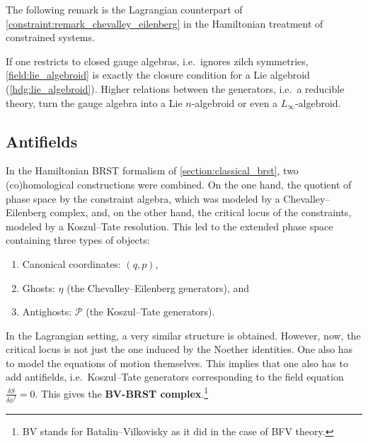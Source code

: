     The following remark is the Lagrangian counterpart of \cref{constraint:remark_chevalley_eilenberg} in the Hamiltonian treatment of constrained systems.
    \begin{remark}
        If one restricts to closed gauge algebras, i.e.~ignores zilch symmetries, \cref{field:lie_algebroid} is exactly the closure condition for a Lie algebroid (\cref{hdg:lie_algebroid}). Higher relations between the generators, i.e.~a reducible theory, turn the gauge algebra into a Lie $n$-algebroid or even a $L_\infty$-algebroid.
    \end{remark}

\subsection{Antifields}

    In the Hamiltonian BRST formalism of \cref{section:classical_brst}, two (co)homological constructions were combined. On the one hand, the quotient of phase space by the constraint algebra, which was modeled by a Chevalley--Eilenberg complex, and, on the other hand, the critical locus of the constraints, modeled by a Koszul--Tate resolution. This led to the extended phase space containing three types of objects:
    \begin{enumerate}
        \item Canonical coordinates: $(q,p)$,
        \item Ghosts: $\eta$ (the Chevalley--Eilenberg generators), and
        \item Antighosts: $\mathcal{P}$ (the Koszul--Tate generators).
    \end{enumerate}
    In the Lagrangian setting, a very similar structure is obtained. However, now, the critical locus is not just the one induced by the Noether identities. One also has to model the equations of motion themselves. This implies that one also has to add antifields, i.e.~Koszul--Tate generators corresponding to the field equation $\frac{\delta S}{\delta\phi^I}=0$. This gives the \textbf{BV-BRST complex}.\footnote{BV stands for Batalin--Vilkovisky as it did in the case of BFV theory.}

